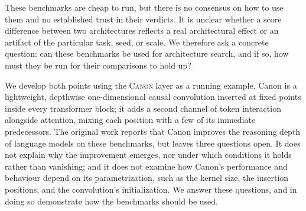 \documentclass[11pt]{article}
\newcommand{\Canon}{\textsc{Canon}\xspace}
\begin{document}
These benchmarks are cheap to run, but there is no consensus on how to use them and no
established trust in their verdicts. It is unclear whether a score difference between two
architectures reflects a real architectural effect or an artifact of the particular task,
seed, or scale. We therefore ask a concrete question: can these benchmarks be used for
architecture search, and if so, how must they be run for their comparisons to hold up?

We develop both points using the \Canon layer \citep{allen-zhu2025canon} as a running example. Canon
is a lightweight, depthwise one-dimensional causal convolution inserted at fixed points
inside every transformer block; it adds a second channel of token interaction alongside
attention, mixing each position with a few of its immediate predecessors. The original work
reports that Canon improves the reasoning depth of language models on these benchmarks, but
leaves three questions open. It does not explain why the improvement emerges, nor under
which conditions it holds rather than vanishing; and it does not examine how Canon's
performance and behaviour depend on its parametrization, such as the kernel size, the
insertion positions, and the convolution's initialization. We answer these questions, and
in doing so demonstrate how the benchmarks should be used.
\end{document}
